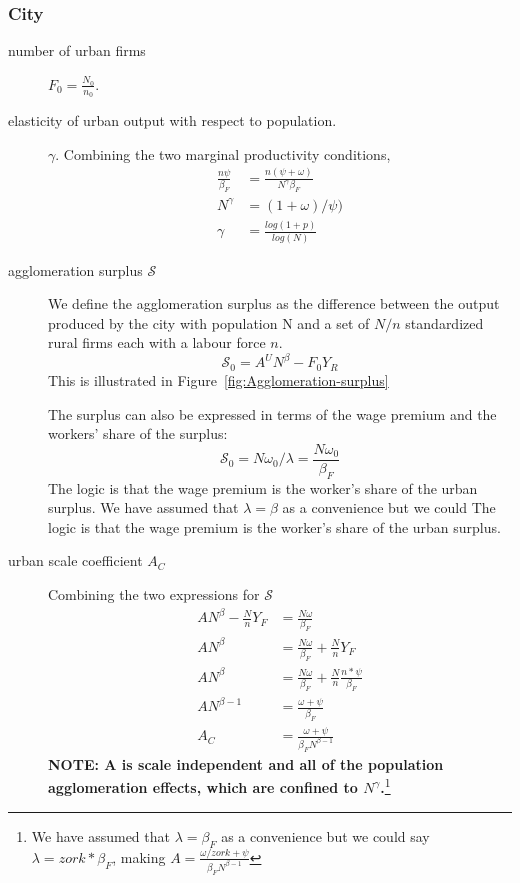 \subsubsection{City}
\begin{description}

\item[number of urban firms]  $F_0=\frac{N_0}{n_0}$. %

\item[elasticity of urban output with respect to population.] $\gamma$. Combining the two marginal productivity conditions, 
\begin{align}
\frac{n\psi}{\beta_F}  &= \frac{n(\psi+\omega)}{N^\gamma \beta_F}  \\
N^\gamma &= (1+\omega)/\psi)\\
\gamma &= \frac{log(1+p)}{log(N)}
\end{align}

\item [agglomeration surplus $\mathcal{S}$] We define the agglomeration surplus as the difference between the output produced by  the city with population N and a set of $N/n$ standardized rural firms each with a labour force $n$. 
\[\mathcal{S_0}=A^U N^\beta-F_0Y_R \] 
This is illustrated in Figure~\ref{fig:Agglomeration-surplus}

The surplus can also be expressed in terms of the wage premium and the workers' share of the surplus:
\[\mathcal{S_0}=N\omega_0/\lambda=\frac{N\omega_0}{\beta_F}\] 
The logic is that the wage premium is the worker's share of the urban surplus. We have assumed that $\lambda=\beta$ as a convenience but we could 
The logic is that the wage premium is the worker's share of the urban surplus. 

\item[urban scale coefficient $A_C$] Combining the two expressions for $\mathcal{S}$
\begin{align*}
 AN^\beta-\frac{N}{n}Y_F    &=\frac{N\omega}{\beta_F}\\ 
 AN^\beta   &=\frac{N\omega}{\beta_F} + \frac{N}{n}Y_F \\
 AN^\beta   &=\frac{N\omega}{\beta_F} + \frac{N}{n}\frac{n*\psi}{\beta_F}\\
AN^{\beta-1}   &=\frac{\omega+\psi}{\beta_F}\\ 
  A_C&=\frac{\omega+\psi}{\beta_FN^{\beta-1}}
\end{align*}
\textbf{NOTE: A is scale independent and all of the population agglomeration effects, which are confined to $N^\gamma$.}\footnote{We have assumed that $\lambda=\beta_F$ as a convenience but we could say $\lambda=zork*\beta_F$, making $A=\frac{\omega/zork +\psi}{\beta_FN^{\beta-1}}$ }
\end{description}






